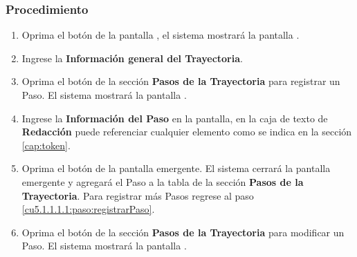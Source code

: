 \subsubsection{Procedimiento}
\begin{enumerate}
	\item Oprima el botón  de la pantalla , el sistema mostrará la pantalla . 

	
	\item Ingrese la \textbf{Información general del Trayectoria}.
	
	\item Oprima el botón  de la sección \textbf{Pasos de la Trayectoria} para registrar un Paso. El sistema mostrará la pantalla . \label{cu5.1.1.1.1:paso:registrarPaso}

	
	\item Ingrese la \textbf{Información del Paso} en la pantalla, en la caja de texto de \textbf{Redacción} puede referenciar cualquier elemento como se indica en la sección \ref{cap:token}.
	
	\item Oprima el botón  de la pantalla emergente. El sistema cerrará la pantalla emergente y agregará el Paso a la tabla de la sección \textbf{Pasos de la Trayectoria}. Para registrar más Pasos regrese al paso \ref{cu5.1.1.1.1:paso:registrarPaso}.
	
	\item Oprima el botón \btnEditar de la sección \textbf{Pasos de la Trayectoria} para modificar un Paso. El sistema mostrará la pantalla . \label{cu5.1.1.1.1:paso:modificarPaso}


\end{enumerate}
